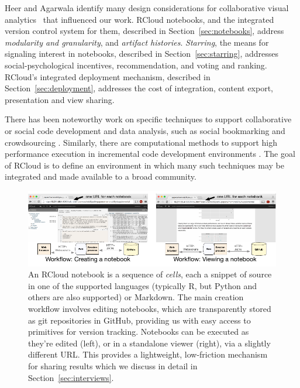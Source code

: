 Heer and Agarwala identify many design considerations for
collaborative visual analytics~\cite{Heer:2008:DCF} that
influenced our work.
RCloud notebooks, and the integrated version control system for them,
described in Section~\ref{sec:notebooks}, address {\it modularity and
granularity}, and {\it artifact histories}.
\emph{Starring}, the means for signaling interest in notebooks, described in
Section~\ref{sec:starring}, addresses social-psychological incentives,
recommendation, and voting and ranking. RCloud's integrated deployment
mechanism, described in Section~\ref{sec:deployment}, addresses the cost of
integration, content export, presentation and view sharing.


There has been noteworthy work on specific techniques
to support collaborative or social code development and data analysis,
such as social bookmarking \cite{Millen:2006:DSB} \cite{Heer:2007:VAV}
and crowdsourcing \cite{Fast:2014:ECS}.
Similarly, there are computational methods to support high
performance execution in incremental code development
environments \cite{Guo:2010:TPI}.
The goal of RCloud is to define an environment in which many such
techniques may be integrated and made available to a broad community.
\begin{figure}
  \vspace{-1.5em}
\centering
\includegraphics[width=.95\linewidth]{fig/notebook/notebook.pdf}
  \vspace{-1.5em}
\caption{\label{fig:notebook}An RCloud notebook is a sequence of
\emph{cells}, each a snippet of source in one of the supported languages (typically R, but Python and others are also supported) or Markdown. The main creation workflow involves editing notebooks, which are transparently stored as git repositories in GitHub, providing us with easy access to primitives for version tracking. Notebooks can be executed as they're edited (left), or in a standalone viewer (right), via a slightly different URL. This provides a lightweight, low-friction mechanism for sharing results which we discuss in detail in Section~\ref{sec:interviews}. }
  \vspace{-1.5em}
\end{figure}

